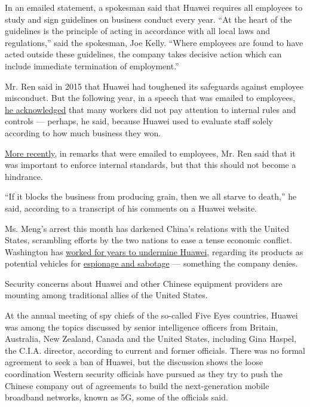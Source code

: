 In an emailed statement, a spokesman said that Huawei requires all
employees to study and sign guidelines on business conduct every year.
``At the heart of the guidelines is the principle of acting in
accordance with all local laws and regulations,'' said the spokesman,
Joe Kelly. ``Where employees are found to have acted outside these
guidelines, the company takes decisive action which can include
immediate termination of employment.''

Mr. Ren said in 2015 that Huawei had toughened its safeguards against
employee misconduct. But the following year, in a speech that was
emailed to employees,
\href{http://www.c114.com.cn/news/126/a991198.html}{he acknowledged}
that many workers did not pay attention to internal rules and controls
--- perhaps, he said, because Huawei used to evaluate staff solely
according to how much business they won.

\href{https://mp.weixin.qq.com/s/v_d66ls4A2zcd0n92xCh-A}{More recently},
in remarks that were emailed to employees, Mr. Ren said that it was
important to enforce internal standards, but that this should not become
a hindrance.

``If it blocks the business from producing grain, then we all starve to
death,'' he said, according to a transcript of his comments on a Huawei
website.

Ms. Meng's arrest this month has darkened China's relations with the
United States, scrambling efforts by the two nations to ease a tense
economic conflict. Washington has
\href{https://www.nytimes.com/2018/12/14/business/huawei-meng-hsbc-canada.html}{worked
for years to undermine Huawei}, regarding its products as potential
vehicles for
\href{https://www.nytimes.com/2018/12/06/technology/huawei-arrest-meng-wanzhou.html}{espionage
and sabotage} --- something the company denies.

Security concerns about Huawei and other Chinese equipment providers are
mounting among traditional allies of the United States.

At the annual meeting of spy chiefs of the so-called Five Eyes
countries, Huawei was among the topics discussed by senior intelligence
officers from Britain, Australia, New Zealand, Canada and the United
States, including Gina Haspel, the C.I.A. director, according to current
and former officials. There was no formal agreement to seek a ban of
Huawei, but the discussion shows the loose coordination Western security
officials have pursued as they try to push the Chinese company out of
agreements to build the next-generation mobile broadband networks, known
as 5G, some of the officials said.

